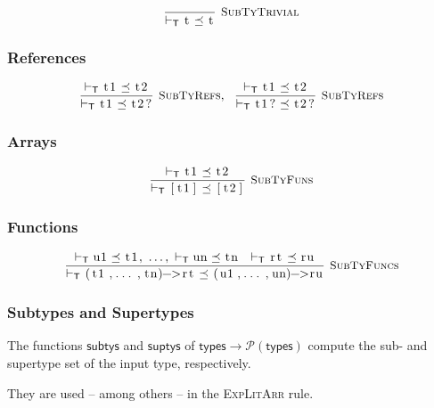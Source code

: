 \documentclass{article}
\newcommand{\code}[1]{\lstinline[columns=fixed]{#1}}
\newcommand{\drmrule}[5]{\frac{#1}{#2\vdash_{\mathsf{#3}}#4}\textsc{\ \small{#5}}}
\newcommand{\ruleapp}[1]{\vdash_{\mathsf{#1}}}
\newcommand{\mc}[1]{\textnormal{\code{#1}}}
\begin{document}
				\begin{align*}
					\drmrule{}{}{T}{\mc{t} \preceq \mc{t}}{SubTyTrivial}
				\end{align*}
				
			\subsubsection{References}
			
				\begin{align*}
					\drmrule{\ruleapp{T}\mc{t1} \preceq \mc{t2}}{}{T}{\mc{t1} \preceq \mc{t2?}}{SubTyRefs},\ \ 
					\drmrule{\ruleapp{T}\mc{t1}\preceq\mc{t2}}{}{T}{\mc{t1?} \preceq \mc{t2?}}{SubTyRefs}
				\end{align*}
				
			\subsubsection{Arrays}
			
				\begin{align*}
					\drmrule{\ruleapp{T}\mc{t1}\preceq\mc{t2}}{}{T}{\mc{[t1]}\preceq\mc{[t2]}}{SubTyFuns}
				\end{align*}
		
			\subsubsection{Functions}
			
				\begin{align*}
					\drmrule{\ruleapp{T}\mc{u1}\preceq\mc{t1},\ \dots,\ \ruleapp{T}\mc{un}\preceq\mc{tn}\ \ \ruleapp{T}\mc{rt}\preceq\mc{ru}}{}{T}{\mc{(t1,...,tn)->rt} \preceq \mc{(u1,...,un)->ru}}{SubTyFuncs}
				\end{align*}
				
			\subsubsection{Subtypes and Supertypes}
			
				The functions $\mathsf{subtys}$ and $\mathsf{suptys}$ of $\mathsf{types}\to\mathcal{P}(\mathsf{types})$ compute the sub- and supertype set of the input type, respectively.
				
				They are used -- among others -- in the \textsc{ExpLitArr} rule.
				
\end{document}
